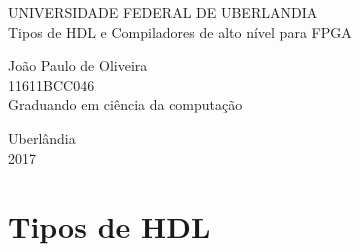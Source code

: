 \documentclass[12pt,a4paper]{article}
\begin{document}
\begin{titlepage}
\begin{center}
\large UNIVERSIDADE FEDERAL DE UBERLANDIA \\
\vspace{6cm}
Tipos de HDL e Compiladores de alto nível para FPGA
\vspace{2cm}
\begin{flushright}
João Paulo de Oliveira\\
11611BCC046\\
Graduando em ciência da computação
\end{flushright}
\vspace{8cm}
Uberlândia\\
2017
\end{center}
\end{titlepage}
\section{Tipos de HDL}
\end{document}
